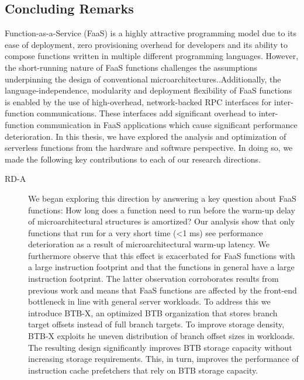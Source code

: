 \documentclass[../main.tex]{subfiles}
\begin{document}
\ifx\chapincluded\undefined
  \begin{refsection}
 \fi

\chapter{Concluding Remarks}
\label{chap:conclusions}
Function-as-a-Service (FaaS) is a highly attractive programming model
due to its ease of deployment, zero provisioning overhead for
developers and its ability to compose functions written in multiple
different programming languages. However, the short-running nature of
FaaS functions challenges the assumptions underpinning the design of
conventional microarchitectures..Additionally, the
language-independence, modularity and deployment flexibility of FaaS
functions is enabled by the use of high-overhead, network-backed RPC
interfaces for inter-function communications. These interfaces add
significant overhead to inter-function communication in FaaS
applications which cause significant performance deterioration. In
this thesis, we have explored the analysis and optimization of
serverless functions from the hardware and software perspective. In
doing so, we made the following key contributions to each of our
research directions.

\begin{description}

\item[RD-A] We began exploring this direction by answering a key
  question about FaaS functions: How long does a function need to run
  before the warm-up delay of microarchitectural structures is
  amortized? Our analysis show that only functions that run for a very
  short time (<1 ms) see performance deterioration as a result of
  microarchitectural warm-up latency. We furthermore observe that this
  effect is exacerbated for FaaS functions with a large instruction
  footprint and that the functions in general have a large instruction
  footprint. The latter observation corroborates results from previous
  work and means that FaaS functions are affected by the front-end
  bottleneck in line with general server workloads. To address this we
  introduce BTB-X, an optimized BTB organization that stores branch
  target offsets instead of full branch targets. To improve storage
  density, BTB-X exploits \texttt{}he uneven distribution of branch offset
  sizes in workloads. The resulting design significantly improves BTB
  storage capacity without increasing storage requirements. This, in
  turn, improves the performance of instruction cache prefetchers that
  rely on BTB storage capacity.


\end{description}
\end{refsection}
\end{document}
